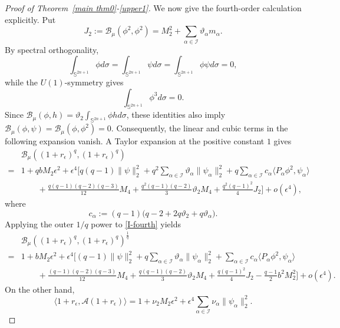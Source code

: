 \documentclass[11pt]{article}
\begin{document}
\begin{proof}[Proof of Theorem~\ref{main thm0}-\eqref{upper1}]
We now give the fourth-order calculation explicitly. Put
{\begin{equation*}
 J_2:=\mathcal B_\mu(\phi^2,\phi^2)
 =M_2^2+\sum_{\alpha\in\mathcal I}\vartheta_\alpha m_\alpha.
\end{equation*}}
By spectral orthogonality,
\[
\int_{\mathbb S^{2n+1}}\phi d\sigma
=\int_{\mathbb S^{2n+1}}\psi d\sigma
=\int_{\mathbb S^{2n+1}}\phi\psi d\sigma=0,
\]
while the $U(1)$-symmetry gives
\[
\int_{\mathbb S^{2n+1}}\phi^3 d\sigma=0.
\]
Since $\mathcal B_\mu(\phi,h)
=\vartheta_2\int_{\mathbb S^{2n+1}}\phi h d\sigma$, these identities also imply
$\mathcal B_\mu(\phi,\psi)=\mathcal B_\mu(\phi,\phi^2)=0$.
Consequently, the linear and cubic terms in the following expansion vanish.
A Taylor expansion at the positive constant $1$ gives
\begin{align}\label{I-fourth}
 &{\mathcal B_\mu((1+r_\epsilon)^q,(1+r_\epsilon)^q)}\nonumber\\
 =&1+qbM_2\epsilon^2+\epsilon^4\Bigg[
 q(q-1)\|\psi\|_2^2+q^2\sum_{\alpha\in\mathcal I}\vartheta_\alpha\|\psi_\alpha\|_2^2
 +q\sum_{\alpha\in\mathcal I}c_\alpha\langle P_\alpha\phi^2,\psi_\alpha\rangle\nonumber\\
 &\qquad+\frac{q(q-1)(q-2)(q-3)}{12}M_4
 +\frac{q^2(q-1)(q-2)}3\vartheta_2M_4
 +\frac{q^2(q-1)^2}{4}J_2\Bigg]+o(\epsilon^4),
\end{align}
where
\begin{equation}\label{dc'-def}
 c_\alpha:=(q-1)\big(q-2+2q\vartheta_2+q\vartheta_\alpha\big).
\end{equation}
Applying the outer $1/q$ power to \eqref{I-fourth} yields
\begin{align}\label{outer-fourth}
 &{\mathcal B_\mu((1+r_\epsilon)^q,(1+r_\epsilon)^q)}^{\frac{1}{q}}\nonumber\\
 =&1+bM_2\epsilon^2+\epsilon^4\Bigg[
 (q-1)\|\psi\|_2^2+q\sum_{\alpha\in\mathcal I}\vartheta_\alpha\|\psi_\alpha\|_2^2
 +\sum_{\alpha\in\mathcal I}c_\alpha\langle P_\alpha\phi^2,\psi_\alpha\rangle\nonumber\\
 &\qquad+\frac{(q-1)(q-2)(q-3)}{12}M_4
 +\frac{q(q-1)(q-2)}3\vartheta_2M_4
 +\frac{q(q-1)^2}{4}J_2
 -\frac{q-1}{2}b^2M_2^2\Bigg]+o(\epsilon^4).
\end{align}
On the other hand,
\begin{equation}\label{energy-fourth}
 \langle1+r_\epsilon,\mathscr A(1+r_\epsilon)\rangle
 =1+\nu_2M_2\epsilon^2+\epsilon^4\sum_{\alpha\in\mathcal I}\nu_\alpha\|\psi_\alpha\|_2^2.
\end{equation}
\begingroup

\end{proof}
\end{document}
